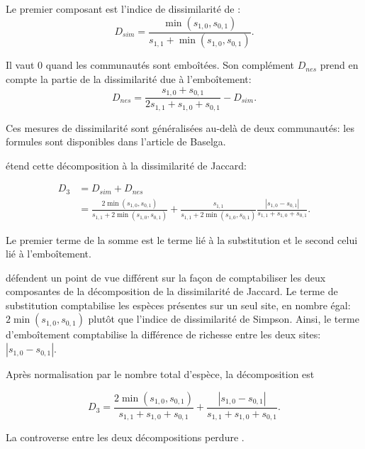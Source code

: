 \documentclass[
  11pt,
  french,
  a4paper,
  extrafontsizes,onecolumn,openright
  ]{memoir}
\begin{document}
Le premier composant est l'indice de dissimilarité de \textcite{Simpson1943}:
\begin{equation}
  \label{eq:Simpson1943}
  D_{sim} = \frac{\min(s_{1,0},s_{0,1})}{s_{1,1}+\min(s_{1,0},s_{0,1})}.
\end{equation}

Il vaut 0 quand les communautés sont emboîtées.
Son complément \(D_{nes}\) prend en compte la partie de la dissimilarité due à l'emboîtement:
\begin{equation}
  \label{eq:DNesReplBS}
  D_{nes} 
  = \frac{s_{1,0} + s_{0,1}}{2s_{1,1} + s_{1,0} + s_{0,1}}
  - D_{sim}.
\end{equation}

Ces mesures de dissimilarité sont généralisées au-delà de deux communautés: les formules sont disponibles dans l'article de Baselga.

\textcite{Baselga2012} étend cette décomposition à la dissimilarité de Jaccard:

\begin{align}
  \label{eq:DNesReplBJ}
  D_3
  &= D_{sim} + D_{nes} \\
  &= \frac{2\min(s_{1,0},s_{0,1})}{s_{1,1}+2\min(s_{1,0},s_{0,1})}
  + \frac{s_{1,1}}{s_{1,1}+2\min(s_{1,0},s_{0,1})}\frac{|s_{1,0}-s_{0,1}|}{s_{1,1}+s_{1,0}+s_{0,1}}.
\end{align}

Le premier terme de la somme est le terme lié à la substitution et le second celui lié à l'emboîtement.

\textcite{Podani2011} défendent un point de vue différent sur la façon de comptabiliser les deux composantes de la décomposition de la dissimilarité de Jaccard.
Le terme de substitution comptabilise les espèces présentes sur un seul site, en nombre égal: \(2\min(s_{1,0},s_{0,1})\) plutôt que l'indice de dissimilarité de Simpson.
Ainsi, le terme d'emboîtement comptabilise la différence de richesse entre les deux sites: \(|s_{1,0}-s_{0,1}|\).

Après normalisation par le nombre total d'espèce, la décomposition est

\begin{equation}
  \label{eq:DNesReplPJ}
  D_3
  = \frac{2\min(s_{1,0},s_{0,1})}{s_{1,1} + s_{1,0} + s_{0,1}}
  + \frac{|s_{1,0}-s_{0,1}|}{s_{1,1} + s_{1,0} + s_{0,1}}.
\end{equation}

La controverse entre les deux décompositions perdure \autocite{Podani2016}.
\end{document}
